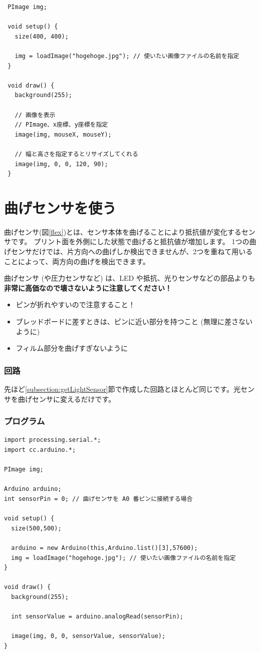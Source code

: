 \documentclass[11pt,a4paper]{jarticle}
\begin{document}
\begin{lstlisting}
 PImage img;
 
 void setup() {
   size(400, 400);

   img = loadImage("hogehoge.jpg"); // 使いたい画像ファイルの名前を指定
 }

 void draw() {
   background(255);

   // 画像を表示
   // PImage、x座標、y座標を指定
   image(img, mouseX, mouseY);

   // 幅と高さを指定するとリサイズしてくれる
   image(img, 0, 0, 120, 90);
 }
\end{lstlisting}

\section{曲げセンサを使う}
曲げセンサ(図\ref{flex})とは、センサ本体を曲げることにより抵抗値が変化するセンサです。
プリント面を外側にした状態で曲げると抵抗値が増加します。
1つの曲げセンサだけでは、片方向への曲げしか検出できませんが、2つを重ねて用いることによって、両方向の曲げを検出できます。

曲げセンサ (や圧力センサなど) は、LED や抵抗、光りセンサなどの部品よりも\textbf{非常に高価なので壊さないように注意してください！}

\begin{itemize}
 \item ピンが折れやすいので注意すること！
 \item ブレッドボードに差すときは、ピンに近い部分を持つこと (無理に差さないように)
 \item フィルム部分を曲げすぎないように
\end{itemize}

\subsubsection*{回路}
先ほど\ref{subsection:getLightSensor}節で作成した回路とほとんど同じです。光センサを曲げセンサに変えるだけです。

\subsubsection*{プログラム}
\begin{lstlisting}
import processing.serial.*;
import cc.arduino.*;

PImage img;

Arduino arduino;
int sensorPin = 0; // 曲げセンサを A0 番ピンに接続する場合

void setup() {
  size(500,500);
  
  arduino = new Arduino(this,Arduino.list()[3],57600);
  img = loadImage("hogehoge.jpg"); // 使いたい画像ファイルの名前を指定
}

void draw() {
  background(255);
  
  int sensorValue = arduino.analogRead(sensorPin);
    
  image(img, 0, 0, sensorValue, sensorValue);
}
\end{lstlisting}
\end{document}
